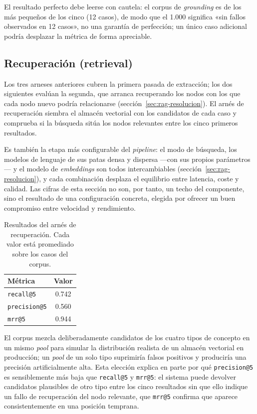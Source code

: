 El resultado perfecto debe leerse con cautela: el corpus de \textit{grounding} es de los más pequeños
de los cinco (12 casos), de modo que el 1.000 significa «sin fallos observados en 12 casos», no una
garantía de perfección; un único caso adicional podría desplazar la métrica de forma apreciable.

\subsection{Recuperación (retrieval)}

Los tres arneses anteriores cubren la primera pasada de extracción; los dos siguientes evalúan la
segunda, que arranca recuperando los nodos con los que cada nodo nuevo podría relacionarse
(sección~\ref{sec:rag-resolucion}). El arnés de recuperación siembra el almacén vectorial con los
candidatos de cada caso y comprueba si la búsqueda sitúa los nodos relevantes entre los cinco
primeros resultados.

Es también la etapa más configurable del \textit{pipeline}: el modo de búsqueda, los modelos de
lenguaje de sus patas densa y dispersa —con sus propios parámetros— y el modelo de
\textit{embeddings} son todos intercambiables (sección~\ref{sec:rag-resolucion}), y cada
combinación desplaza el equilibrio entre latencia, coste y calidad. Las cifras de esta sección no
son, por tanto, un techo del componente, sino el resultado de una configuración concreta, elegida
por ofrecer un buen compromiso entre velocidad y rendimiento.

\begin{table}[H]
  \centering
  \begin{tabular}{lc}
    \toprule
    \textbf{Métrica} & \textbf{Valor} \\
    \midrule
    \texttt{recall@5}    & 0.742 \\
    \texttt{precision@5} & 0.560 \\
    \texttt{mrr@5}       & 0.944 \\
    \bottomrule
  \end{tabular}
  \caption{Resultados del arnés de recuperación. Cada valor está promediado sobre los casos del
           corpus.}
  \label{tab:eval-retrieval}
\end{table}

El corpus mezcla deliberadamente candidatos de los cuatro tipos de concepto en un mismo
\textit{pool} para simular la distribución realista de un almacén
vectorial en producción; un \textit{pool} de un solo tipo suprimiría falsos positivos y
produciría una precisión artificialmente alta. Esta elección explica en parte por qué
\texttt{precision@5} es sensiblemente más baja que \texttt{recall@5} y \texttt{mrr@5}: el
sistema puede devolver candidatos plausibles de otro tipo entre los cinco resultados sin que
ello indique un fallo de recuperación del nodo relevante, que \texttt{mrr@5} confirma que
aparece consistentemente en una posición temprana.

